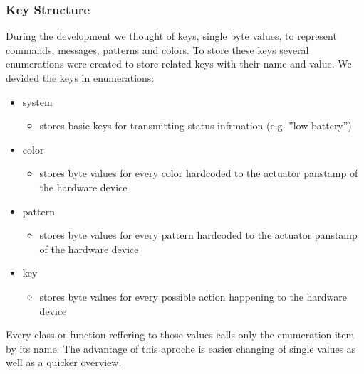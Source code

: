\subsubsection{Key Structure}
During the development we thought of keys, single byte values, to represent commands, messages, patterns and colors. To store these keys several enumerations were created to store related keys with their name and value.
We devided the keys in enumerations:
\begin{itemize}
    \item system
    \begin{itemize}
         \item stores basic keys for transmitting status infrmation (e.g. ''low battery'')
    \end{itemize}
    \item color
    \begin{itemize}
        \item stores byte values for every color hardcoded to the actuator panstamp of the hardware device
    \end{itemize}
    \item pattern
    \begin{itemize}
        \item stores byte values for every pattern hardcoded to the actuator panstamp of the hardware device
    \end{itemize}
    \item key
    \begin{itemize}
        \item stores byte values for every possible action happening to the hardware device
    \end{itemize}
\end{itemize} 

Every class or function reffering to those values calls only the enumeration item by its name. The advantage of this aproche is easier changing of single values as well as a quicker overview.
